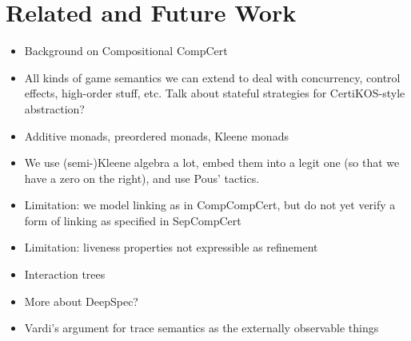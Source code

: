 \documentclass[acmsmall,timestamp,review,anonymous]{acmart}
\begin{document}


\section{Related and Future Work} %

\begin{itemize}
\item Background on Compositional CompCert
\item All kinds of game semantics we can extend to deal with
  concurrency, control effects, high-order stuff, etc.
  Talk about stateful strategies for CertiKOS-style abstraction?
\item
  Additive monads, preordered monads, Kleene monads
\item
  We use (semi-)Kleene algebra a lot,
  embed them into a legit one (so that we have a zero on the right),
  and use Pous' tactics.
\item
  Limitation:
  we model linking as in CompCompCert,
  but do not yet verify a form of linking as specified in SepCompCert
\item
  Limitation:
  liveness properties not expressible as refinement
\item
  Interaction trees
\item
  More about DeepSpec?
\item
  Vardi's argument for trace semantics
  as the externally observable things
\end{itemize}




\end{document}
